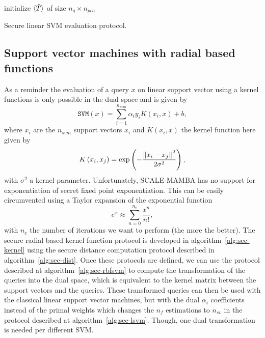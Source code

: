 \begin{center}
\begin{algorithm}[H]
\DontPrintSemicolon
initialize $\langle \tilde{T} \rangle$ of size $n_q \times n_{pca}$ \;
\caption{Secure linear SVM evaluation protocol.}
\label{alg:sec-lsvm}
\end{algorithm}
\end{center}

\subsection{Support vector machines with radial based functions}
As a reminder the evaluation of a query $x$ on linear support vector using a kernel functions is only possible in the dual space and is given by
\begin{equation}
    \mathtt{SVM}(x) = \sum_{i=1}^{n_{svm}} \alpha_i y_i K(x_i,x) + b,
\end{equation}
where $x_i$ are the $n_{svm}$ support vectors $x_i$ and $K(x_i,x)$ the kernel function here given by
\begin{equation}
    K\left( x_i,x_j\right) = \exp\left(-\frac{\left\lVert x_i - x_j\right\rVert^2}{2\sigma^2}\right),
\end{equation}
with $\sigma^2$ a kernel parameter. Unfortunately, SCALE-MAMBA has no support for exponentiation of secret fixed point exponentiation. This can be easily circumvented using a Taylor expansion of the exponential function
\begin{equation}
    e^x \approx \sum_{n=0}^{n_e} \frac{x^n}{n!},
\end{equation}
with $n_e$ the number of iterations we want to perform (the more the better). The secure radial based kernel function protocol is developed in algorithm~\ref{alg:sec-kernel} using the secure distance computation protocol described in algorithm~\ref{alg:sec-dist}. Once these protocols are defined, we can use the protocol described at algorithm~\ref{alg:sec-rbfsvm} to compute the transformation of the queries into the dual space, which is equivalent to the kernel matrix between the support vectors and the queries. These transformed queries can then be used with the classical linear support vector machines, but with the dual $\alpha_i$ coefficients instead of the primal weights which changes the $n_f$ estimations to $n_{sv}$ in the protocol described at algorithm~\ref{alg:sec-lsvm}. Though, one dual transformation is needed per different SVM.

